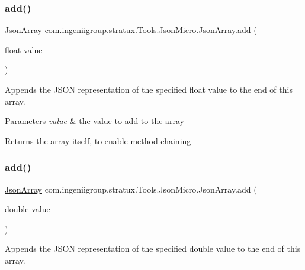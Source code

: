 \subsubsection{\texorpdfstring{add()}{add()}\hspace{0.1cm}{\footnotesize\ttfamily [3/7]}}
{\footnotesize\ttfamily \hyperlink{classcom_1_1ingeniigroup_1_1stratux_1_1_tools_1_1_json_micro_1_1_json_array}{Json\+Array} com.\+ingeniigroup.\+stratux.\+Tools.\+Json\+Micro.\+Json\+Array.\+add (\begin{DoxyParamCaption}\item[{float}]{value }\end{DoxyParamCaption})}

Appends the J\+S\+ON representation of the specified {\ttfamily float} value to the end of this array.


\begin{DoxyParams}{Parameters}
{\em value} & the value to add to the array \\
\hline
\end{DoxyParams}
\begin{DoxyReturn}{Returns}
the array itself, to enable method chaining 
\end{DoxyReturn}
\mbox{\label{classcom_1_1ingeniigroup_1_1stratux_1_1_tools_1_1_json_micro_1_1_json_array_a4ee932ecb5678a584c9e3454b2b17268}} 
\subsubsection{\texorpdfstring{add()}{add()}\hspace{0.1cm}{\footnotesize\ttfamily [4/7]}}
{\footnotesize\ttfamily \hyperlink{classcom_1_1ingeniigroup_1_1stratux_1_1_tools_1_1_json_micro_1_1_json_array}{Json\+Array} com.\+ingeniigroup.\+stratux.\+Tools.\+Json\+Micro.\+Json\+Array.\+add (\begin{DoxyParamCaption}\item[{double}]{value }\end{DoxyParamCaption})}

Appends the J\+S\+ON representation of the specified {\ttfamily double} value to the end of this array.



